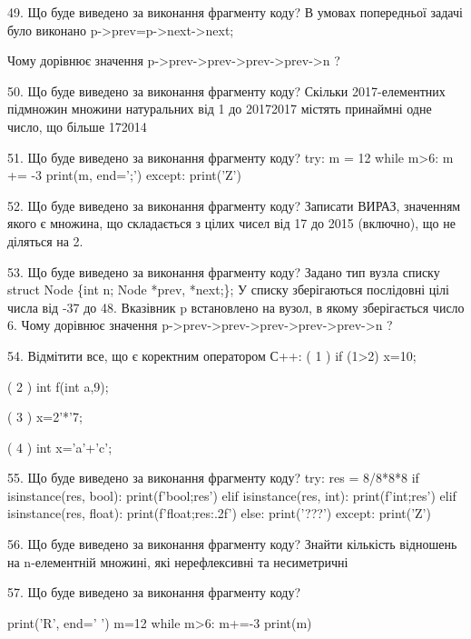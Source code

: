 \documentclass[11pt]{article}
\begin{document}

49. Що буде виведено за виконання фрагменту коду?
В умовах попередньої задачі було виконано p->prev=p->next->next;

Чому дорівнює значення p->prev->prev->prev->prev->n ?

50. Що буде виведено за виконання фрагменту коду?
Скільки 2017-елементних підмножин множини натуральних від 1 до 20172017 містять принаймні одне число, що більше 172014

51. Що буде виведено за виконання фрагменту коду?
try:
    m = 12
    while m>6:
        m += -3
    print(m, end=';')
except:
    print('Z')


52. Що буде виведено за виконання фрагменту коду?
Записати ВИРАЗ, значенням якого є множина, що складається з цілих чисел від 17 до 2015 (включно), що не діляться на 2.

53. Що буде виведено за виконання фрагменту коду?
Задано тип вузла списку
struct Node \{int n; Node *prev, *next;\};
У списку зберігаються послідовні цілі числа від -37 до 48. Вказівник p встановлено на вузол, в якому зберігається число 6.
Чому дорівнює значення p->prev->prev->prev->prev->prev->n ?

54. %
Відмітити все, що є коректним оператором С++:
( 1 ) if (1>2) x=10;

( 2 ) int f(int a,9);

( 3 ) x=2'*'7;

( 4 ) int x='a'+'c';


55. Що буде виведено за виконання фрагменту коду?
try:
    res = 8/8*8*8
    if isinstance(res, bool):
        print(f'bool;{res}')
    elif isinstance(res, int):
        print(f'int;{res}')
    elif isinstance(res, float):
        print(f'float;{res:.2f}')
    else:
        print('???')
except:
    print('Z')


56. Що буде виведено за виконання фрагменту коду?
Знайти кількість відношень на n-елементній множині, які нерефлексивні та несиметричні

57. Що буде виведено за виконання фрагменту коду?

print('R', end=' ')
m=12
while m>6:
    m+=-3
print(m)


\end{document}
